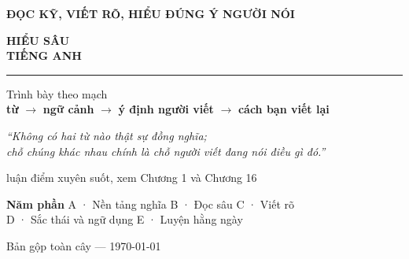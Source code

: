 \documentclass[11pt,a4paper,oneside]{report}
\begin{document}
\begin{titlepage}
\thispagestyle{empty}

\vspace*{4.2cm}
\begin{flushleft}
{\sffamily\bfseries\color{accent}\large ĐỌC KỸ, VIẾT RÕ, HIỂU ĐÚNG Ý NGƯỜI NÓI\par}
\vspace{0.5cm}
{\sffamily\bfseries\color{inkblue}\fontsize{40}{45}\selectfont
HIỂU SÂU\\[0.12em] TIẾNG ANH\par}
\vspace{0.9cm}
{\color{accent}\rule{7cm}{2.4pt}}\par
\vspace{0.9cm}
{\large\color{inkblue!85}
Trình bày theo mạch\\[0.25em]
\textbf{từ} \(\rightarrow\) \textbf{ngữ cảnh} \(\rightarrow\) \textbf{ý định người viết} \(\rightarrow\) \textbf{cách bạn viết lại}\par}
\end{flushleft}

\vfill
\begin{flushleft}
{\itshape\color{tiercol}``Không có hai từ nào thật sự đồng nghĩa;\\
chỗ chúng khác nhau chính là chỗ người viết đang nói điều gì đó.''\par}
{\footnotesize\sffamily\color{tiercol}luận điểm xuyên suốt, xem Chương 1 và Chương 16\par}
\vspace{1.1cm}
{\footnotesize\sffamily\color{inkblue}\textbf{Năm phần}\quad
A · Nền tảng nghĩa \quad B · Đọc sâu \quad C · Viết rõ\\[0.25em]
\quad D · Sắc thái và ngữ dụng \quad E · Luyện hằng ngày\par}
\vspace{0.5em}
{\footnotesize\sffamily\color{tiercol}Bản gộp toàn cây --- \today\par}
\end{flushleft}
\end{titlepage}


\cleardoublepage
\tableofcontents
\cleardoublepage
{}











\printbibliography[title={Nguồn}]
\end{document}
